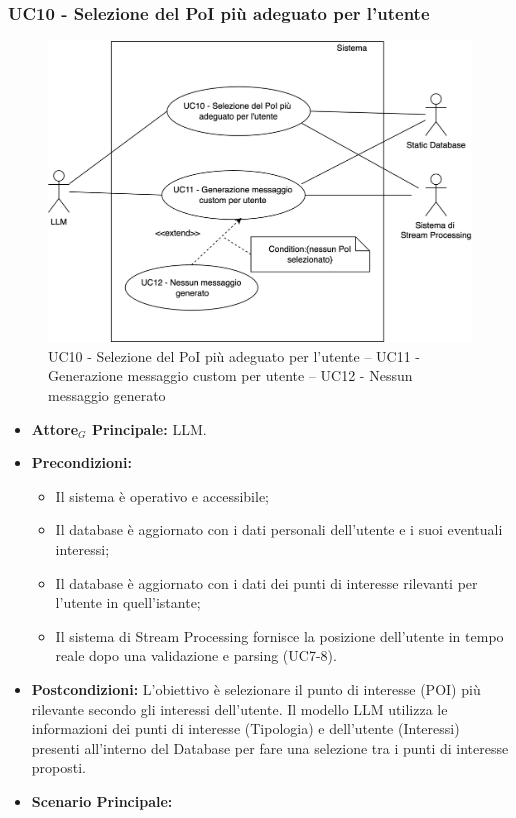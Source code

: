 \documentclass[11pt]{article}
\begin{document}
\begin{justify}
\subsubsection{\textbf{UC10 - Selezione del PoI più adeguato per l'utente}}
\begin{figure}[H]
    \centering
    \includegraphics[width=0.7\linewidth]{UC101112image.png}
    \caption{UC10 - Selezione del PoI più adeguato per l'utente -- UC11 - Generazione messaggio custom per utente -- UC12 - Nessun messaggio generato}
    \label{fig:UC101112}
\end{figure}
\label{UC10}
\begin{itemize}
    \item \textbf{Attore$_G$ Principale:} LLM.
    \item \textbf{Precondizioni:} 
        \begin{itemize}
          \item Il sistema è operativo e accessibile;
            \item Il database è aggiornato con i dati personali dell'utente e i suoi eventuali interessi;
            \item Il database è aggiornato con i dati dei punti di interesse rilevanti per l'utente in quell'istante;
            \item Il sistema di Stream Processing fornisce la posizione dell'utente in tempo reale dopo una validazione e parsing (UC7-8).
        \end{itemize}
      \item \textbf{Postcondizioni:} L'obiettivo è selezionare il punto di interesse (POI) più rilevante secondo gli interessi dell'utente. Il modello LLM utilizza le informazioni dei punti di interesse (Tipologia) e dell'utente (Interessi) presenti all'interno del Database per fare una selezione tra i punti di interesse proposti.\\
    \item \textbf{Scenario Principale:} 

\end{itemize}
\end{justify}
\end{document}
